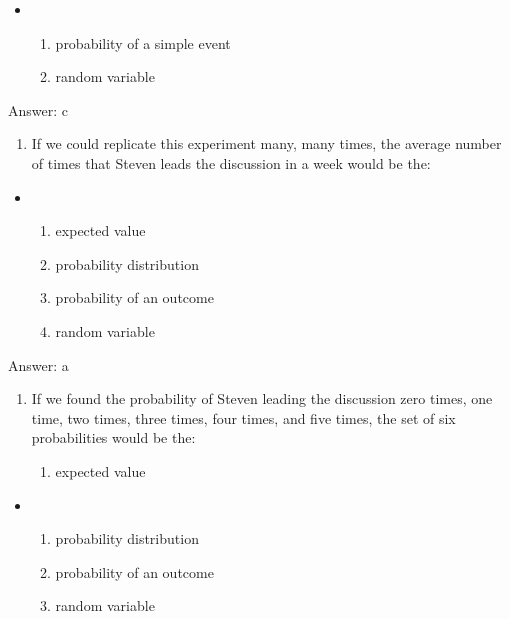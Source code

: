 \documentclass[]{article}
\providecommand{\tightlist}{%
  \setlength{\itemsep}{0pt}\setlength{\parskip}{0pt}}
\begin{document}
\begin{itemize}
\item
  \begin{enumerate}
  \def\labelenumi{\alph{enumi}.}
  \setcounter{enumi}{2}
  \tightlist
  \item
    probability of a simple event
  \item
    random variable
  \end{enumerate}
\end{itemize}

Answer: c

\begin{enumerate}
\def\labelenumi{\arabic{enumi}.}
\setcounter{enumi}{24}
\tightlist
\item
  If we could replicate this experiment many, many times, the average
  number of times that Steven leads the discussion in a week would be
  the:
\end{enumerate}

\begin{itemize}
\item
  \begin{enumerate}
  \def\labelenumi{\alph{enumi}.}
  \item
    expected value
  \item
    probability distribution
  \item
    probability of an outcome
  \item
    random variable
  \end{enumerate}
\end{itemize}

Answer: a

\begin{enumerate}
\def\labelenumi{\arabic{enumi}.}
\setcounter{enumi}{25}
\item
  If we found the probability of Steven leading the discussion zero
  times, one time, two times, three times, four times, and five times,
  the set of six probabilities would be the:

  \begin{enumerate}
  \def\labelenumii{\alph{enumii}.}
  \tightlist
  \item
    expected value
  \end{enumerate}
\end{enumerate}

\begin{itemize}
\item
  \begin{enumerate}
  \def\labelenumi{\alph{enumi}.}
  \setcounter{enumi}{1}
  \tightlist
  \item
    probability distribution
  \item
    probability of an outcome
  \item
    random variable
  \end{enumerate}
\end{itemize}
\end{document}
